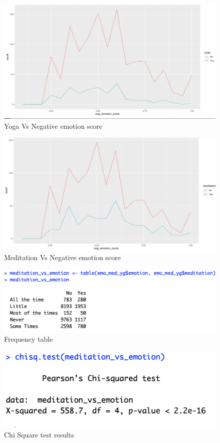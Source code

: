 \documentclass[12pt]{article}
\begin{document}
\begin{figure}[H]
\centering
\includegraphics[scale = 0.4]{yogascore.png}
\caption{Yoga Vs Negative emotion score}
\label{fig:yoga}
\end{figure}

\begin{figure}[H]
\centering
\includegraphics[scale=0.4]{medscore.png}
\caption{Meditation Vs Negative emotion score}
\label{fig:meditation}
\end{figure}

\begin{figure}[H]
\centering
\includegraphics[scale=0.5]{table.png}
\caption{Frequency table}
\label{fig:frequency}
\end{figure}

\begin{figure}[H]
\centering
\includegraphics[scale=0.5]{chisqResult.png}
\caption{Chi Square test results}
\label{fig:chisq}
\end{figure}
\end{document}

